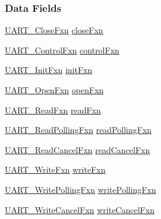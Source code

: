 \subsubsection*{Data Fields}
\begin{DoxyCompactItemize}
\item 
\hyperlink{_u_a_r_t_8h_a220a3f8443b9112ee98253078f92eb27}{U\-A\-R\-T\-\_\-\-Close\-Fxn} \hyperlink{struct_u_a_r_t___fxn_table_ab21579c919ae5ebfc3180358d7439787}{close\-Fxn}
\item 
\hyperlink{_u_a_r_t_8h_ae4032cc8e010c6e11793d646de541c24}{U\-A\-R\-T\-\_\-\-Control\-Fxn} \hyperlink{struct_u_a_r_t___fxn_table_a350e08db86d6de3e45e950d077208df6}{control\-Fxn}
\item 
\hyperlink{_u_a_r_t_8h_a07f8e43acf7db146a5585e12ee86a2cf}{U\-A\-R\-T\-\_\-\-Init\-Fxn} \hyperlink{struct_u_a_r_t___fxn_table_a56e1ef00843055476e9b88a510a801d7}{init\-Fxn}
\item 
\hyperlink{_u_a_r_t_8h_a66aef06e71cd9d94b4baccfa05f60e8a}{U\-A\-R\-T\-\_\-\-Open\-Fxn} \hyperlink{struct_u_a_r_t___fxn_table_afd53378ea35fb42710bcf5520acf05fa}{open\-Fxn}
\item 
\hyperlink{_u_a_r_t_8h_af7763f31e8786639a1a9e468c03dc57f}{U\-A\-R\-T\-\_\-\-Read\-Fxn} \hyperlink{struct_u_a_r_t___fxn_table_ac4cc1fdecea3b36d525034122a84d4ee}{read\-Fxn}
\item 
\hyperlink{_u_a_r_t_8h_a0528ac54e13ccc7be4a35e07a09196cb}{U\-A\-R\-T\-\_\-\-Read\-Polling\-Fxn} \hyperlink{struct_u_a_r_t___fxn_table_a42eee2074bfa5ec52aba695227935e3d}{read\-Polling\-Fxn}
\item 
\hyperlink{_u_a_r_t_8h_a4a59d01e896c6a223ed56b251ca5b1bf}{U\-A\-R\-T\-\_\-\-Read\-Cancel\-Fxn} \hyperlink{struct_u_a_r_t___fxn_table_ab2799a9e8d84457fa842b66965d93ceb}{read\-Cancel\-Fxn}
\item 
\hyperlink{_u_a_r_t_8h_afef1aa5e8050d49da2b07530e7f7b7d9}{U\-A\-R\-T\-\_\-\-Write\-Fxn} \hyperlink{struct_u_a_r_t___fxn_table_a91feea9956f15f89d8def60d79bf0ece}{write\-Fxn}
\item 
\hyperlink{_u_a_r_t_8h_ac7a41a69d6a6f895dcf2276f1ca7bc6c}{U\-A\-R\-T\-\_\-\-Write\-Polling\-Fxn} \hyperlink{struct_u_a_r_t___fxn_table_a3339c9996ef55652fd500e3958ed2dc2}{write\-Polling\-Fxn}
\item 
\hyperlink{_u_a_r_t_8h_a0fdca649842b40bf9bdbc6e83698eea5}{U\-A\-R\-T\-\_\-\-Write\-Cancel\-Fxn} \hyperlink{struct_u_a_r_t___fxn_table_a5eb722a7231589656f26cb1e8b06095e}{write\-Cancel\-Fxn}
\end{DoxyCompactItemize}


